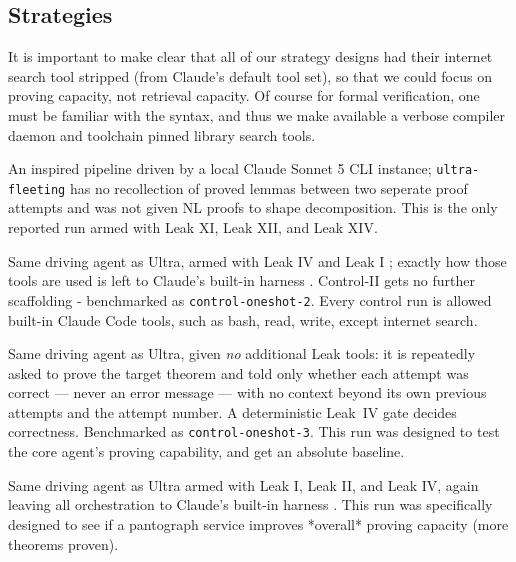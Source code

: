 \documentclass[12pt, a4paper]{article}
\newcommand{\run}[1]{\texttt{#1}}
\begin{document}
\subsection{Strategies}
\label{sec:strategies}

\begin{description}[itemsep=2pt]

  \item It is important to make clear that all of our strategy designs had their internet search tool stripped (from Claude's default tool set), so that
      we could focus on proving capacity, not retrieval capacity. Of course for formal verification, one must be familiar
      with the syntax, and thus we make available a verbose compiler daemon and toolchain pinned library search tools.
  \item[Ultra (Lifted Goedel Architect).] An inspired pipeline driven by a local
        Claude Sonnet 5 CLI \cite{anthropic2026sonnet5} instance; \run{ultra-fleeting} has no recollection
        of proved lemmas between two seperate proof attempts and was not given NL proofs to shape decomposition. This
        is the only reported run armed with Leak XI, Leak XII, and Leak XIV. 
  \item[Control~II (compiler + lemma search).] Same driving agent as Ultra, armed with Leak IV and Leak I
        \cite{loogle,moogle}; exactly how those tools are used is left to
        Claude's built-in harness \cite{anthropicharness}. Control-II gets no further scaffolding - benchmarked as
        \run{control-oneshot-2}. Every control run is allowed built-in Claude Code tools, such as bash, read, write, except internet search.
  \item[Control III (blind prover).] Same driving agent as Ultra, given \emph{no} additional Leak tools:
        it is repeatedly asked to prove the target theorem and told only whether
        each attempt was correct --- never an error message --- with no context
        beyond its own previous attempts and the attempt number. A deterministic
        Leak~IV gate decides correctness. Benchmarked as \run{control-oneshot-3}. This
        run was designed to test the core agent's proving capability, and get an absolute baseline.
  \item[Control IV (compiler + pantograph + lemma search).] Same driving agent as Ultra armed with
        Leak I, Leak II, and Leak IV, again leaving all orchestration to Claude's built-in harness \cite{anthropicharness}.
        This run was specifically designed to see if a pantograph service improves *overall* proving capacity (more theorems proven).
\end{description}
\end{document}
